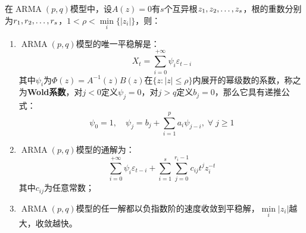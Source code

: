 \begin{theorem}\label{theo:ARMAPQSolution}
	在$\operatorname{ARMA}(p,q)$模型中，设$A(z)=0$有$s$个互异根$z_1, z_2, \dots, z_{s}$，根的重数分别为$r_1, r_2, \dots, r_{s}$，$1<\rho<\min\limits_i\{|z_i|\}$，则：
	\begin{enumerate}
		\item $\operatorname{ARMA}(p,q)$模型的唯一平稳解是：
		\begin{equation*}
			X_t=\sum_{i=0}^{+\infty}\psi_i\varepsilon_{t-i}
		\end{equation*}
		其中$\psi_i$为$\Phi(z)=A^{-1}(z)B(z)$在$\{z:|z|\leqslant\rho\}$内展开的幂级数的系数，称之为\textbf{Wold系数}，对$j<0$定义$\psi_j=0$，对$j>q$定义$b_j=0$，那么它具有递推公式：
		\begin{equation*}
			\psi_0=1,\quad\psi_j=b_j+\sum_{i=1}^{p}a_i\psi_{j-i},\;\forall\;j\geqslant1
		\end{equation*}
		\item $\operatorname{ARMA}(p,q)$模型的通解为：
		\begin{equation*}
			\sum_{i=0}^{+\infty}\psi_i\varepsilon_{t-i}+\sum_{i=1}^{s}\sum_{j=0}^{r_i-1}c_{ij}t^{j}z_i^{-t}
		\end{equation*}
		其中$c_{ij}$为任意常数；
		\item $\operatorname{ARMA}(p,q)$模型的任一解都以负指数阶的速度收敛到平稳解，$\min\limits_i{|z_i|}$越大，收敛越快。
	\end{enumerate}
\end{theorem}
